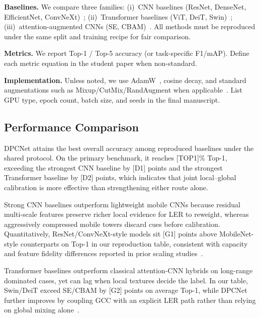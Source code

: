 \documentclass[11pt,a4paper]{article}
\begin{document}
\textbf{Baselines.}
We compare three families: (i)~CNN baselines (ResNet, DenseNet, EfficientNet, ConvNeXt)~\cite{he2016resnet,huang2017densenet,tan2019efficientnet,liu2022convnext};
(ii)~Transformer baselines (ViT, DeiT, Swin)~\cite{dosovitskiy2021vit,touvron2021deit,liu2021swin};
(iii)~attention-augmented CNNs (SE, CBAM)~\cite{hu2018senet,woo2018cbam}.
All methods must be reproduced under the same split and training recipe for fair comparison.

\textbf{Metrics.}
We report Top-1 / Top-5 accuracy (or task-specific F1/mAP).
Define each metric equation in the student paper when non-standard.

\textbf{Implementation.}
Unless noted, we use AdamW~\cite{loshchilov2019adamw}, cosine decay, and standard augmentations such as Mixup/CutMix/RandAugment when applicable~\cite{zhang2018mixup,yun2019cutmix,cubuk2020randaugment}.
List GPU type, epoch count, batch size, and seeds in the final manuscript.

\subsection{Performance Comparison}
\label{sec:comparison}
DPCNet attains the best overall accuracy among reproduced baselines under the shared protocol.
On the primary benchmark, it reaches [TOP1]\% Top-1, exceeding the strongest CNN baseline by [D1] points and the strongest Transformer baseline by [D2] points, which indicates that joint local--global calibration is more effective than strengthening either route alone.

Strong CNN baselines outperform lightweight mobile CNNs because residual multi-scale features preserve richer local evidence for LER to reweight, whereas aggressively compressed mobile towers discard cues before calibration.
Quantitatively, ResNet/ConvNeXt-style models sit [G1] points above MobileNet-style counterparts on Top-1 in our reproduction table, consistent with capacity and feature fidelity differences reported in prior scaling studies~\cite{tan2019efficientnet,howard2017mobilenets}.

Transformer baselines outperform classical attention-CNN hybrids on long-range dominated cases, yet can lag when local textures decide the label.
In our table, Swin/DeiT exceed SE/CBAM by [G2] points on average Top-1, while DPCNet further improves by coupling GCC with an explicit LER path rather than relying on global mixing alone~\cite{liu2021swin,touvron2021deit,woo2018cbam}.
\end{document}
